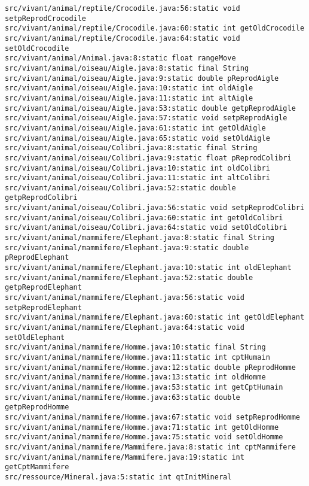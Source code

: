 \documentclass[11pt,a4paper]{article}
\begin{document}
\begin{itemize}
\begin{Verbatim}[xleftmargin=.3in, breaklines=true, breakanywhere=true]
src/vivant/animal/reptile/Crocodile.java:56:static void setpReprodCrocodile
src/vivant/animal/reptile/Crocodile.java:60:static int getOldCrocodile
src/vivant/animal/reptile/Crocodile.java:64:static void setOldCrocodile
src/vivant/animal/Animal.java:8:static float rangeMove
src/vivant/animal/oiseau/Aigle.java:8:static final String
src/vivant/animal/oiseau/Aigle.java:9:static double pReprodAigle
src/vivant/animal/oiseau/Aigle.java:10:static int oldAigle
src/vivant/animal/oiseau/Aigle.java:11:static int altAigle
src/vivant/animal/oiseau/Aigle.java:53:static double getpReprodAigle
src/vivant/animal/oiseau/Aigle.java:57:static void setpReprodAigle
src/vivant/animal/oiseau/Aigle.java:61:static int getOldAigle
src/vivant/animal/oiseau/Aigle.java:65:static void setOldAigle
src/vivant/animal/oiseau/Colibri.java:8:static final String
src/vivant/animal/oiseau/Colibri.java:9:static float pReprodColibri
src/vivant/animal/oiseau/Colibri.java:10:static int oldColibri
src/vivant/animal/oiseau/Colibri.java:11:static int altColibri
src/vivant/animal/oiseau/Colibri.java:52:static double getpReprodColibri
src/vivant/animal/oiseau/Colibri.java:56:static void setpReprodColibri
src/vivant/animal/oiseau/Colibri.java:60:static int getOldColibri
src/vivant/animal/oiseau/Colibri.java:64:static void setOldColibri
src/vivant/animal/mammifere/Elephant.java:8:static final String
src/vivant/animal/mammifere/Elephant.java:9:static double pReprodElephant
src/vivant/animal/mammifere/Elephant.java:10:static int oldElephant
src/vivant/animal/mammifere/Elephant.java:52:static double getpReprodElephant
src/vivant/animal/mammifere/Elephant.java:56:static void setpReprodElephant
src/vivant/animal/mammifere/Elephant.java:60:static int getOldElephant
src/vivant/animal/mammifere/Elephant.java:64:static void setOldElephant
src/vivant/animal/mammifere/Homme.java:10:static final String
src/vivant/animal/mammifere/Homme.java:11:static int cptHumain
src/vivant/animal/mammifere/Homme.java:12:static double pReprodHomme
src/vivant/animal/mammifere/Homme.java:13:static int oldHomme
src/vivant/animal/mammifere/Homme.java:53:static int getCptHumain
src/vivant/animal/mammifere/Homme.java:63:static double getpReprodHomme
src/vivant/animal/mammifere/Homme.java:67:static void setpReprodHomme
src/vivant/animal/mammifere/Homme.java:71:static int getOldHomme
src/vivant/animal/mammifere/Homme.java:75:static void setOldHomme
src/vivant/animal/mammifere/Mammifere.java:8:static int cptMammifere
src/vivant/animal/mammifere/Mammifere.java:19:static int getCptMammifere
src/ressource/Mineral.java:5:static int qtInitMineral

\end{Verbatim}
\end{itemize}
\end{document}
